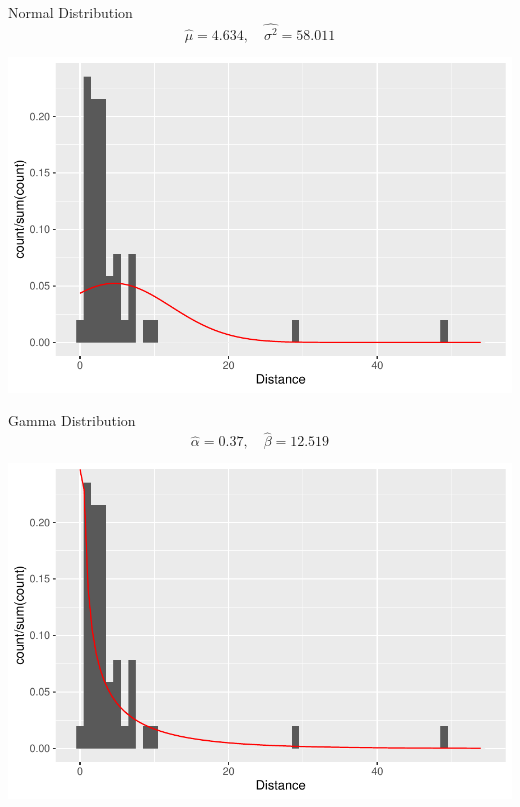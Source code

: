 \begin{frame}

\begin{block}{Normal Distribution}
$$
\hat \mu = 4.634, \quad \widehat{\sigma^2} = 58.011 
$$

\begin{center}
\includegraphics[height=.5\textheight]{figure/normal-1.pdf}
\end{center}

\end{block}
\end{frame}



\begin{frame}

\begin{block}{Gamma Distribution}
$$
\hat{\alpha} = 0.37, \quad \hat{\beta} = 12.519 
$$

\begin{center}
\includegraphics[height=.5\textheight]{figure/gamma-1.pdf}
\end{center}
\end{block}
\end{frame}

